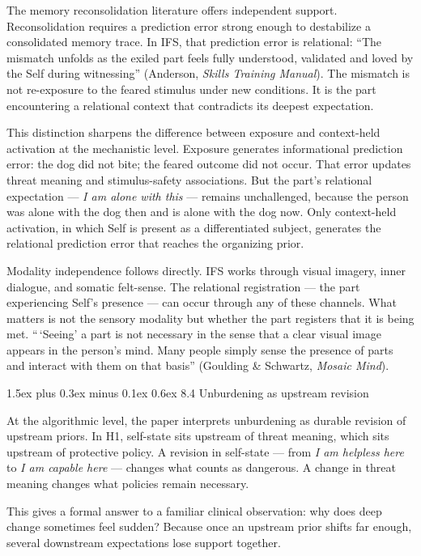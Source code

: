 \documentclass[12pt,a4paper]{article}
\makeatletter
\renewcommand\subsubsection{\@startsection{subsubsection}{3}{0pt}%
  {1.5ex plus 0.3ex minus 0.1ex}%
  {0.6ex}%
  {\normalsize\itshape}}
\makeatother
\begin{document}
The memory reconsolidation literature offers independent support.
Reconsolidation requires a prediction error strong enough to destabilize
a consolidated memory trace. In IFS, that prediction error is
relational: ``The mismatch unfolds as the exiled part feels fully
understood, validated and loved by the Self during witnessing''
(Anderson, \emph{Skills Training Manual}). The mismatch is not
re-exposure to the feared stimulus under new conditions. It is the part
encountering a relational context that contradicts its deepest
expectation.

This distinction sharpens the difference between exposure and
context-held activation at the mechanistic level. Exposure generates
informational prediction error: the dog did not bite; the feared outcome
did not occur. That error updates threat meaning and stimulus-safety
associations. But the part's relational expectation --- \emph{I am alone
with this} --- remains unchallenged, because the person was alone with
the dog then and is alone with the dog now. Only context-held
activation, in which Self is present as a differentiated subject,
generates the relational prediction error that reaches the organizing
prior.

Modality independence follows directly. IFS works through visual
imagery, inner dialogue, and somatic felt-sense. The relational
registration --- the part experiencing Self's presence --- can occur
through any of these channels. What matters is not the sensory modality
but whether the part registers that it is being met. ``\,`Seeing' a part
is not necessary in the sense that a clear visual image appears in the
person's mind. Many people simply sense the presence of parts and
interact with them on that basis'' (Goulding \& Schwartz, \emph{Mosaic
Mind}).

\subsubsection{8.4 Unburdening as upstream
revision}\label{unburdening-as-upstream-revision}

At the algorithmic level, the paper interprets unburdening as durable
revision of upstream priors. In H1, self-state sits upstream of threat
meaning, which sits upstream of protective policy. A revision in
self-state --- from \emph{I am helpless here} to \emph{I am capable
here} --- changes what counts as dangerous. A change in threat meaning
changes what policies remain necessary.

This gives a formal answer to a familiar clinical observation: why does
deep change sometimes feel sudden? Because once an upstream prior shifts
far enough, several downstream expectations lose support together.
\end{document}
